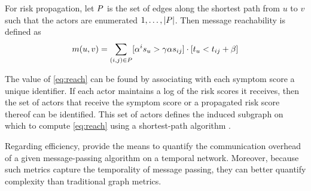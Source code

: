For risk propagation, let $P$ is the set of edges along the shortest path from $u$ to $v$ such that the actors are enumerated $1, \ldots, \left\vert P \right\vert$. Then message reachability is defined as
%
\begin{equation}\label{eq:reach}
  m(u, v) = \sum_{(i, j) \in P} [\alpha^{i} s_u > \gamma \alpha s_{ij}] \cdot [t_u < t_{ij} + \beta]
\end{equation}
%

The value of \eqref{eq:reach} can be found by associating with each symptom score a unique identifier. If each actor maintains a log of the risk scores it receives, then the set of actors that receive the symptom score or a propagated risk score thereof can be identified. This set of actors defines the induced subgraph on which to compute \eqref{eq:reach} using a shortest-path algorithm \citep{Johnson1977}. 

Regarding efficiency,  provide the means to quantify the communication overhead of a given message-passing algorithm on a temporal network. Moreover, because such metrics capture the temporality of message passing, they can better quantify complexity than traditional graph metrics.

